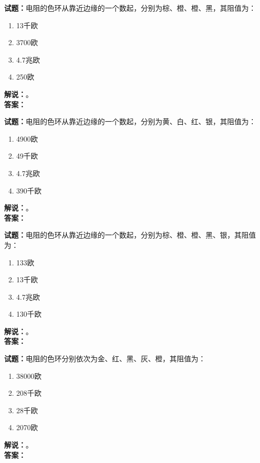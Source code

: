\documentclass{ctexbook}
\begin{document}
\vspace{\baselineskip}

\noindent\textbf{试题：}电阻的色环从靠近边缘的一个数起，分别为棕、橙、橙、黑，其阻值为：
\begin{enumerate}[leftmargin=3em]
  \item 13千欧
  \item 3700欧
  \item 4.7兆欧
  \item 250欧
\end{enumerate}
\noindent\textbf{解说：}\textbf{}。\\\noindent\textbf{答案：}

\vspace{\baselineskip}

\noindent\textbf{试题：}电阻的色环从靠近边缘的一个数起，分别为黄、白、红、银，其阻值为：
\begin{enumerate}[leftmargin=3em]
  \item 4900欧
  \item 49千欧
  \item 4.7兆欧
  \item 390千欧
\end{enumerate}
\noindent\textbf{解说：}\textbf{}。\\\noindent\textbf{答案：}

\vspace{\baselineskip}

\noindent\textbf{试题：}电阻的色环从靠近边缘的一个数起，分别为棕、橙、橙、黑、银，其阻值为：
\begin{enumerate}[leftmargin=3em]
  \item 133欧
  \item 13千欧
  \item 4.7兆欧
  \item 130千欧
\end{enumerate}
\noindent\textbf{解说：}\textbf{}。\\\noindent\textbf{答案：}

\vspace{\baselineskip}

\noindent\textbf{试题：}电阻的色环分别依次为金、红、黑、灰、橙，其阻值为：
\begin{enumerate}[leftmargin=3em]
  \item 38000欧
  \item 208千欧
  \item 28千欧
  \item 2070欧
\end{enumerate}
\noindent\textbf{解说：}\textbf{}。\\\noindent\textbf{答案：}
\end{document}
